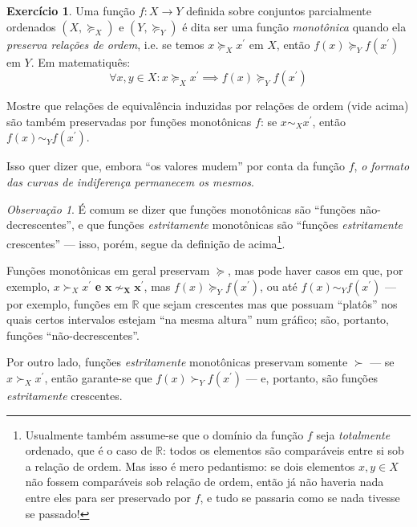 \documentclass[12pt]{article}
\numberwithin{equation}{section}
\theoremstyle{plain}
\theoremstyle{definition}
\newtheorem{exercise}{Exercício}
\theoremstyle{remark}
\newtheorem*{remark}{Observação}
\begin{document}
\begin{exercise}
  Uma função \(f:X \to Y\) definida
sobre conjuntos parcialmente ordenados \((X, \succeq_{X})\) e
\((Y, \succeq_{Y})\) é dita ser uma função \textit{monotônica} quando ela  \emph{preserva relações de ordem}, i.e. se temos \(x \succeq_{X} x^{\prime} \) em \(X\), então
\(f(x) \succeq_{Y} f(x^{\prime} )\) em \(Y\). Em matematiquês: \[
\forall x, y \in X: x \succeq_{X} x^{\prime}  \implies f(x) \succeq_{Y} f(x^{\prime} )
\]

Mostre que relações de equivalência induzidas por relações de ordem (vide acima) são também preservadas por funções monotônicas \(f\): se \(x \sim_X x^{\prime} \), então
\(f(x) \sim_Y f(x^{\prime} )\).

Isso quer dizer que, embora ``os valores mudem'' por conta da função
\(f\), \emph{o formato das curvas de indiferença permanecem os mesmos}.


\begin{remark}
  É comum se dizer que funções monotônicas são ``funções
  não-decrescentes'', e que funções \emph{estritamente} monotônicas são
  ``funções \emph{estritamente} crescentes'' --- isso, porém, segue da
  definição de acima\footnote{Usualmente também assume-se que o domínio da
    função \(f\) seja \emph{totalmente} ordenado, que é o caso de
    \(\mathbb{R}\): todos os elementos são comparáveis entre si sob a
    relação de ordem. Mas isso é mero pedantismo: se dois elementos
    \(x, y \in X\) não fossem comparáveis sob relação de ordem, então já
    não haveria nada entre eles para ser preservado por \(f\), e tudo se
    passaria como se nada tivesse se passado!}. 
    
Funções monotônicas em
  geral preservam \(\succeq\), mas pode haver casos em que, por exemplo,
  \(x \succ_{X} x^{\prime} \) \textbf{e} \(\mathbf{x \nsim_{X} x^{\prime} }\), mas
  \(f(x) \succeq_{Y} f(x^{\prime} )\), ou até \(f(x) \sim_{Y} f(x^{\prime} )\) --- por
  exemplo, funções em \(\mathbb{R}\) que sejam crescentes mas que possuam
  ``platôs'' nos quais certos intervalos estejam ``na mesma altura'' num
  gráfico; são, portanto, funções ``não-decrescentes''. 
  
  Por outro lado,
  funções \emph{estritamente} monotônicas preservam somente \(\succ\) ---
  se \(x \succ_{X} x^{\prime} \), então garante-se que \(f(x) \succ_{Y} f(x^{\prime} )\) ---
  e, portanto, são funções \emph{estritamente} crescentes.
  \end{remark}
\end{exercise}
\end{document}
